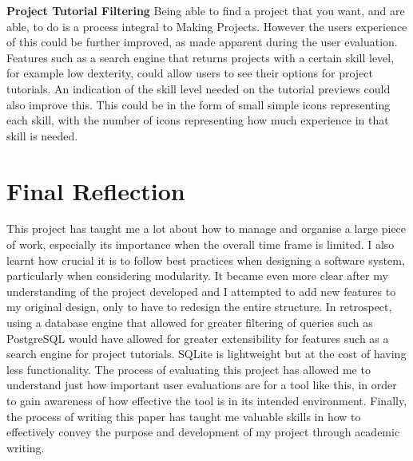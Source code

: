 \documentclass{l4proj}
\begin{document}
\textbf{Project Tutorial Filtering} Being able to find a project that you want, and are able, to do is a process integral to Making Projects. However the users experience of this could be further improved, as made apparent during the user evaluation. Features such as a search engine that returns projects with a certain skill level, for example low dexterity, could allow users to see their options for project tutorials. An indication of the skill level needed on the tutorial previews could also improve this. This could be in the form  of small simple icons representing each skill, with the number of icons representing how much experience in that skill is needed. 


\section{Final Reflection} 
This project has taught me a lot about how to manage and organise a large piece of work, especially its importance when the overall time frame is limited. 
I also learnt how crucial it is to follow best practices when designing a software system, particularly when considering modularity. It became even more clear after my understanding of the project developed and I attempted to add new features to my original design, only to have to redesign the entire structure. In retrospect, using a database engine that allowed for greater filtering of queries such as PostgreSQL would have allowed for greater extensibility for features such as a search engine for project tutorials. SQLite is lightweight but at the cost of having less functionality. 
The process of evaluating this project has allowed me to understand just how important user evaluations are for a tool like this, in order to gain awareness of how effective the tool is in its intended environment. 
Finally, the process of writing this paper has taught me valuable skills in how to effectively convey the purpose and development of my project through academic writing. 

%
% 
\end{document}
